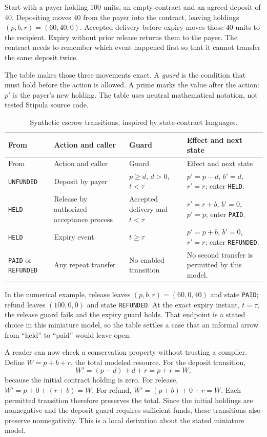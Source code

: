 Start with a payer holding 100 units, an empty contract and an agreed deposit of
40. Depositing moves 40 from the payer into the contract, leaving holdings
$(p,b,r)=(60,40,0)$. Accepted delivery before expiry moves those 40 units to the
recipient. Expiry without prior release returns them to the payer. The contract
needs to remember which event happened first so that it cannot transfer the
same deposit twice.

The table makes those three movements exact. A \emph{guard} is the condition
that must hold before the action is allowed. A prime marks the value after the
action: $p'$ is the payer's new holding. The table uses neutral mathematical
notation, not tested Stipula source code.

\begin{longtable}{@{}P{24mm}P{33mm}P{42mm}P{48mm}@{}}
\caption{Synthetic escrow transitions, inspired by state-contract languages.}\\
\toprule
From & Action and caller & Guard & Effect and next state\\\midrule\endfirsthead
\toprule From & Action and caller & Guard & Effect and next state\\\midrule\endhead
\texttt{UNFUNDED} & Deposit by payer & $p\geq d$, $d>0$, $t<\tau$ & $p'=p-d$, $b'=d$, $r'=r$; enter \texttt{HELD}.\\
\texttt{HELD} & Release by authorized acceptance process & Accepted delivery and $t<\tau$ & $r'=r+b$, $b'=0$, $p'=p$; enter \texttt{PAID}.\\
\texttt{HELD} & Expiry event & $t\geq\tau$ & $p'=p+b$, $b'=0$, $r'=r$; enter \texttt{REFUNDED}.\\
\texttt{PAID} or \texttt{REFUNDED} & Any repeat transfer & No enabled transition & No second transfer is permitted by this model.\\
\bottomrule
\end{longtable}

In the numerical example, release leaves $(p,b,r)=(60,0,40)$ and state
\texttt{PAID}; refund leaves $(100,0,0)$ and state \texttt{REFUNDED}. At the exact
expiry instant, $t=\tau$, the release guard fails and the expiry guard holds.
That endpoint is a stated choice in this miniature model, so the table settles
a case that an informal arrow from ``held'' to ``paid'' would leave open.

A reader can now check a conservation property without trusting a compiler. Define
$W=p+b+r$, the total modeled resource. For the deposit transition,
\begin{equation}
 W'=(p-d)+d+r=p+r=W,
 \label{eq:escrow-deposit}
\end{equation}
because the initial contract holding is zero. For release,
$W'=p+0+(r+b)=W$. For refund, $W'=(p+b)+0+r=W$. Each permitted transition therefore
preserves the total. Since the initial holdings are nonnegative and the deposit
guard requires sufficient funds, these transitions also preserve nonnegativity.
This is a local derivation about the stated miniature model.

